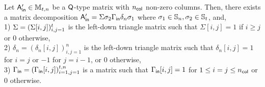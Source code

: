 \begin{theorem}
\label{the::q_decom}
Let $\mathsf{A}_{\mathsf{in}}' \in \mathbb{M}_{t, n}$ be a $\mathsf{Q}$-type matrix with $n_{\mathsf{col}}$ non-zero columns.
Then, there exists a matrix decomposition $\mathsf{A}_{\mathsf{in}}'=\Sigma \sigma_2 \Gamma_{\mathsf{in}} \delta _n \sigma _1$ where $\sigma _1 \in \mathbb{S}_n, \sigma _2 \in \mathbb{S}_t$, and, \\
1) $\Sigma=(\Sigma[i, j])_{i,j=1}^{t}$ is the left-down triangle matrix such that $\Sigma[i, j]=1$ if $i \geq j$ or $0$ otherwise,\\
2) $\delta_n=(\delta_n[i,j])_{i,j=1}^{n}$ is the left-down triangle matrix such that $\delta_n[i,j]=1$ for $i=j$ or $-1$ for $j=i-1$, or $0$ otherwise,\\
3) $\Gamma_{\mathsf{in}} =(\Gamma_{\mathsf{in}}[i,j])_{i=1,j=1}^{t,n}$ is a matrix such that $\Gamma_{\mathsf{in}}[i,j]=1$ for $1\leq i=j\leq n_{\mathsf{col}}$ or $0$ otherwise.
\iffalse
1) $\Sigma=(a_{ij})_{i,j=1}^t$ is the left-down triangle matrix such that $a_{ij}=1$ if $i \geq j$ or $0$ otherwise;
2) $\delta_n=(a_{ij})_{i,j=1}^n$ is the left-down triangle matrix such that $b_{ij}=1$ for $i=j$ or $-1$ for $j=i-1$ or $0$ otherwise;
3) $\gammain=\begin{psmallmatrix}
I_k & O_{k,n-k} \\
O_{t-k,k} & O_{t-k,n-k}
\end{psmallmatrix}=(a_{ij})_{i=1,j=1}^{t,n}$ is a matrix such that $a_{ij}=1$ for $1\leq i=j\leq k$ or $0$ otherwise.
\fi
\end{theorem}
 
